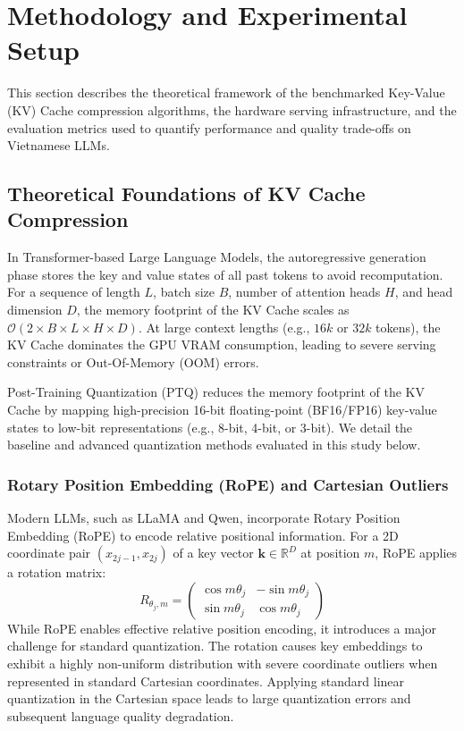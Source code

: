 \section{Methodology and Experimental Setup}
\label{sec:methodology}

This section describes the theoretical framework of the benchmarked Key-Value (KV) Cache compression algorithms, the hardware serving infrastructure, and the evaluation metrics used to quantify performance and quality trade-offs on Vietnamese LLMs.

\subsection{Theoretical Foundations of KV Cache Compression}

In Transformer-based Large Language Models, the autoregressive generation phase stores the key and value states of all past tokens to avoid recomputation. For a sequence of length $L$, batch size $B$, number of attention heads $H$, and head dimension $D$, the memory footprint of the KV Cache scales as $\mathcal{O}(2 \times B \times L \times H \times D)$. At large context lengths (e.g., $16k$ or $32k$ tokens), the KV Cache dominates the GPU VRAM consumption, leading to severe serving constraints or Out-Of-Memory (OOM) errors.

Post-Training Quantization (PTQ) reduces the memory footprint of the KV Cache by mapping high-precision 16-bit floating-point (BF16/FP16) key-value states to low-bit representations (e.g., 8-bit, 4-bit, or 3-bit). We detail the baseline and advanced quantization methods evaluated in this study below.

\subsubsection{Rotary Position Embedding (RoPE) and Cartesian Outliers}
Modern LLMs, such as LLaMA and Qwen, incorporate Rotary Position Embedding (RoPE) to encode relative positional information. For a 2D coordinate pair $(x_{2j-1}, x_{2j})$ of a key vector $\mathbf{k} \in \mathbb{R}^D$ at position $m$, RoPE applies a rotation matrix:
\begin{equation}
R_{\theta_j, m} = \begin{pmatrix} \cos m\theta_j & -\sin m\theta_j \\ \sin m\theta_j & \cos m\theta_j \end{pmatrix}
\end{equation}
While RoPE enables effective relative position encoding, it introduces a major challenge for standard quantization. The rotation causes key embeddings to exhibit a highly non-uniform distribution with severe coordinate outliers when represented in standard Cartesian coordinates. Applying standard linear quantization in the Cartesian space leads to large quantization errors and subsequent language quality degradation.

